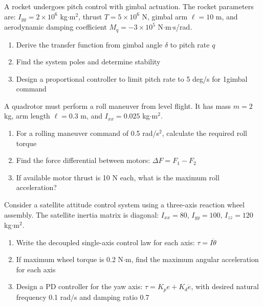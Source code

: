 \begin{exercise}
A rocket undergoes pitch control with gimbal actuation. The rocket parameters are: $I_{yy} = 2 \times 10^6$ kg$\cdot$m$^2$, thrust $T = 5 \times 10^6$ N, gimbal arm $\ell = 10$ m, and aerodynamic damping coefficient $M_q = -3 \times 10^5$ N$\cdot$m$\cdot$s/rad.
\begin{enumerate}[label=(\alph*)]
    \item Derive the transfer function from gimbal angle $\delta$ to pitch rate $q$
    \item Find the system poles and determine stability
    \item Design a proportional controller to limit pitch rate to 5 deg/s for 1\degree gimbal command
\end{enumerate}
\end{exercise}

\begin{exercise}
A quadrotor must perform a roll maneuver from level flight. It has mass $m = 2$ kg, arm length $\ell = 0.3$ m, and $I_{xx} = 0.025$ kg$\cdot$m$^2$.
\begin{enumerate}[label=(\alph*)]
    \item For a rolling maneuver command of 0.5 rad/s$^2$, calculate the required roll torque
    \item Find the force differential between motors: $\Delta F = F_1 - F_2$
    \item If available motor thrust is 10 N each, what is the maximum roll acceleration?
\end{enumerate}
\end{exercise}

\begin{exercise}
Consider a satellite attitude control system using a three-axis reaction wheel assembly. The satellite inertia matrix is diagonal: $I_{xx} = 80$, $I_{yy} = 100$, $I_{zz} = 120$ kg$\cdot$m$^2$.
\begin{enumerate}[label=(\alph*)]
    \item Write the decoupled single-axis control law for each axis: $\tau = I \ddot{\theta}$
    \item If maximum wheel torque is 0.2 N$\cdot$m, find the maximum angular acceleration for each axis
    \item Design a PD controller for the yaw axis: $\tau = K_p e + K_d \dot{e}$, with desired natural frequency 0.1 rad/s and damping ratio 0.7
\end{enumerate}
\end{exercise}
